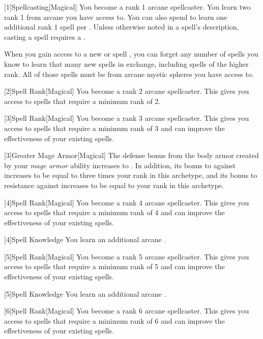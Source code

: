         [1]{Spellcasting}[Magical]
        You become a rank 1 arcane spellcaster.
        You learn two rank 1  from arcane  you have access to.
        You can also spend  to learn one additional rank 1 spell per .
        Unless otherwise noted in a spell's description, casting a spell requires a .

        When you gain access to a new  or spell ,
            you can forget any number of spells you know to learn that many new spells in exchange,
            including spells of the higher rank.
        All of those spells must be from arcane mystic spheres you have access to.

        [2]{Spell Rank}[Magical] You become a rank 2 arcane spellcaster.
        This gives you access to spells that require a minimum rank of 2.

        [3]{Spell Rank}[Magical] You become a rank 3 arcane spellcaster.
        This gives you access to spells that require a minimum rank of 3 and can improve the effectiveness of your existing spells.

        [3]{Greater Mage Armor}[Magical]
        The defense bonus from the body armor created by your \textit{mage armor} ability increases to .
        In addition, its bonus to  against  increases to be equal to three times your rank in this archetype, and its bonus to resistance against  increases to be equal to your rank in this archetype.

        [4]{Spell Rank}[Magical] You become a rank 4 arcane spellcaster.
        This gives you access to spells that require a minimum rank of 4 and can improve the effectiveness of your existing spells.

        [4]{Spell Knowledge} You learn an additional arcane .

        [5]{Spell Rank}[Magical] You become a rank 5 arcane spellcaster.
        This gives you access to spells that require a minimum rank of 5 and can improve the effectiveness of your existing spells.

        [5]{Spell Knowledge} You learn an additional arcane .

        [6]{Spell Rank}[Magical] You become a rank 6 arcane spellcaster.
        This gives you access to spells that require a minimum rank of 6 and can improve the effectiveness of your existing spells.

